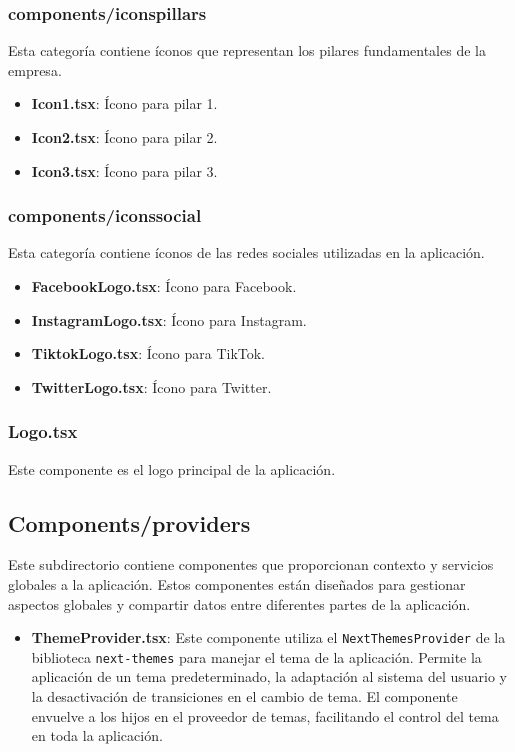 \subsubsection{components/iconspillars}
Esta categoría contiene íconos que representan los pilares fundamentales de la empresa.
\begin{itemize}
    \item \textbf{Icon1.tsx}: Ícono para pilar 1.
    \item \textbf{Icon2.tsx}: Ícono para pilar 2.
    \item \textbf{Icon3.tsx}: Ícono para pilar 3.
\end{itemize}

\subsubsection{components/iconssocial}
Esta categoría contiene íconos de las redes sociales utilizadas en la aplicación.
\begin{itemize}
    \item \textbf{FacebookLogo.tsx}: Ícono para Facebook.
    \item \textbf{InstagramLogo.tsx}: Ícono para Instagram.
    \item \textbf{TiktokLogo.tsx}: Ícono para TikTok.
    \item \textbf{TwitterLogo.tsx}: Ícono para Twitter.
\end{itemize}

\subsubsection{Logo.tsx}
Este componente es el logo principal de la aplicación.


\subsection{Components/providers}
Este subdirectorio contiene componentes que proporcionan contexto y servicios globales a la aplicación. Estos componentes están diseñados para gestionar aspectos globales y compartir datos entre diferentes partes de la aplicación.

\begin{itemize}
    \item \textbf{ThemeProvider.tsx}: Este componente utiliza el \texttt{NextThemesProvider} de la biblioteca \texttt{next-themes} para manejar el tema de la aplicación. Permite la aplicación de un tema predeterminado, la adaptación al sistema del usuario y la desactivación de transiciones en el cambio de tema. El componente envuelve a los hijos en el proveedor de temas, facilitando el control del tema en toda la aplicación.
\end{itemize}

